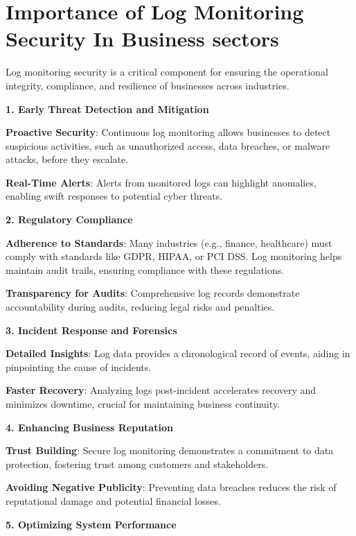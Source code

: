 \section{Importance of Log Monitoring Security In Business sectors}

Log monitoring security is a critical component for ensuring the operational integrity, compliance, and resilience of businesses across industries. 

\textbf{1. Early Threat Detection and Mitigation}


\textbf{Proactive Security}: Continuous log monitoring allows businesses to detect suspicious activities, such as unauthorized access, data breaches, or malware attacks, before they escalate.




\textbf{Real-Time Alerts}: Alerts from monitored logs can highlight anomalies, enabling swift responses to potential cyber threats.


\textbf{2. Regulatory Compliance}


\textbf{Adherence to Standards}: Many industries (e.g., finance, healthcare) must comply with standards like GDPR, HIPAA, or PCI DSS. Log monitoring helps maintain audit trails, ensuring compliance with these regulations.



\textbf{Transparency for Audits}: Comprehensive log records demonstrate accountability during audits, reducing legal risks and penalties.


\textbf{3. Incident Response and Forensics}


\textbf{Detailed Insights}: Log data provides a chronological record of events, aiding in pinpointing the cause of incidents.




\textbf{Faster Recovery}: Analyzing logs post-incident accelerates recovery and minimizes downtime, crucial for maintaining business continuity.


\textbf{4. Enhancing Business Reputation}


\textbf{Trust Building}: Secure log monitoring demonstrates a commitment to data protection, fostering trust among customers and stakeholders.




\textbf{Avoiding Negative Publicity}: Preventing data breaches reduces the risk of reputational damage and potential financial losses.


\textbf{5. Optimizing System Performance}



